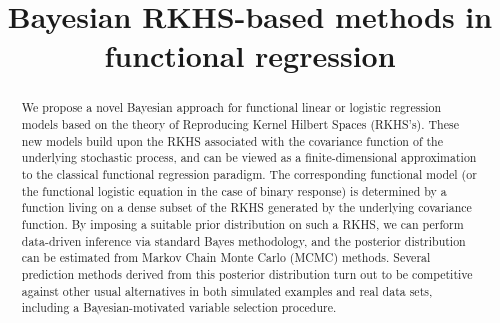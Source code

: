 \documentclass[ba]{imsart}
\numberwithin{equation}{section}
\theoremstyle{plain}
\begin{document}
\begin{frontmatter}
\title{Bayesian RKHS-based methods in functional regression}


\begin{abstract}
We propose a novel Bayesian approach for functional linear or logistic regression models based on the theory of Reproducing Kernel Hilbert Spaces (RKHS's). These new models build upon the RKHS associated with the covariance function of the underlying stochastic process, and can be viewed as a finite-dimensional approximation to the classical functional regression paradigm. The corresponding functional model (or the functional logistic equation in the case of binary response) is determined by a function living on a dense subset of the RKHS generated by the underlying covariance function. By imposing a suitable prior distribution on such a RKHS, we can perform data-driven inference via standard Bayes methodology, and the posterior distribution can be estimated from Markov Chain Monte Carlo (MCMC) methods. Several prediction methods derived from this posterior distribution turn out to be competitive against other usual  alternatives in both simulated examples and real data sets, including a Bayesian-motivated variable selection procedure.
\end{abstract}

\begin{keyword}[class=MSC]
\end{keyword}

\begin{keyword}
\end{keyword}

\end{frontmatter}
\end{document}
